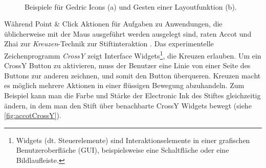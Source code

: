 \begin{figure}
        \myfloatalign
         \quad
         \\
        \caption[Gedric]{Beispiele für Gedric Icons (a) und Gesten einer Layoutfunktion (b).}\label{fig:geisslerGedric}
\end{figure}

\medskip Während Point \& Click Aktionen für Aufgaben zu Anwendungen, die üblicherweise mit der Maus ausgeführt werden ausgelegt sind, raten Accot und Zhai zur \emph{Kreuzen}-Technik zur Stiftinteraktion \citep{Accot:2002}. Das experimentelle Zeichenprogramm \emph{CrossY} \citep{Apitz:2004} zeigt Interface Widgets\footnote{Widgets (dt. Steuerelemente) sind Interaktionselemente in einer grafischen Benutzeroberfläche (GUI), beispielsweise eine Schaltfläche oder eine Bildlaufleiste.}, die Kreuzen erlauben. Um ein CrossY Button zu aktivieren, muss der Benutzer eine Linie von einer Seite des Buttons zur anderen zeichnen, und somit den Button überqueren. Kreuzen macht es möglich mehrere Aktionen in einer flüssigen Bewegung abzuhandeln. Zum Beispiel kann man die Farbe und Stärke der Electronic Ink des Stiftes gleichzeitig ändern, in dem man den Stift über benachbarte CrossY Widgets bewegt (siehe \autoref{fig:accotCrossY}).

